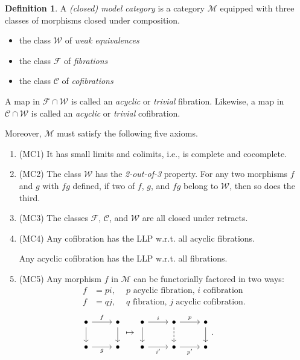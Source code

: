 \documentclass[10pt,letterpaper,cm]{nupset}
\theoremstyle{definition}
\newtheorem{defn}{Definition}[subsection]
\theoremstyle{theorem}
\theoremstyle{remark}
\newcommand{\1}{\mathbb{1}}
\newcommand{\cf}{\mathscr{C}}
\newcommand{\f}{\mathscr{F}}
\newcommand{\m}{\mathcal{M}}
\newcommand{\w}{\mathscr{W}}
\newcommand{\0}{\vec 0}
\newcommand{\bi}{\begin{itemize}}
\newcommand{\ei}{\end{itemize}}
\newcommand{\be}{\begin{enumerate}}
\newcommand{\ee}{\end{enumerate}}
\begin{document}
\begin{defn}
A \textit{(closed) model category} is a category $\m$ equipped with three classes of morphisms closed under composition.
\bi
\item the class $\w$ of \textit{weak equivalences}
\item the class $\f$ of \textit{fibrations}
\item the class $\cf$ of \textit{cofibrations}
\ei
A  map in $\f \cap \w$ is called an \textit{acyclic} or \textit{trivial} fibration. Likewise, a  map in $\cf \cap \w$ is called an \textit{acyclic} or \textit{trivial} cofibration. 

\smallskip

Moreover, $\m$ must satisfy the following five axioms.
\be
\item[(MC1)] It has small limits and colimits, i.e., is complete and cocomplete.
\item[(MC2)] The class $\w$ has the \textit{2-out-of-3} property. For any two morphisms $f$ and $g$ with $fg$ defined, if two of $f$, $g$, and $fg$ belong to $\w$, then so does the third.
\item[(MC3)] The classes $\f$, $\cf$, and $\w$ are all closed under retracts.
\item[(MC4)] Any cofibration has the LLP w.r.t. all acyclic fibrations.

Any acyclic cofibration has the LLP w.r.t. all fibrations. 
\item[(MC5)] Any morphism $f$ in $\m$ can be functorially factored in two ways:
\begin{align*}
f & = pi, \ \quad \text{$p$ acyclic fibration, $i$ cofibration} 
\\ f & = qj, \ \quad  \text{$q$ fibration, $j$  acyclic cofibration} 
.
\end{align*}
\[
 \begin{tikzcd}
	\bullet & \bullet \\
	\bullet & \bullet
	\arrow["f", from=1-1, to=1-2]
	\arrow["g"', from=2-1, to=2-2]
	\arrow[from=1-1, to=2-1]
	\arrow[from=1-2, to=2-2]
\end{tikzcd}  \mapsto 
\begin{tikzcd}
	\bullet & \bullet & \bullet \\
	\bullet & \bullet & \bullet
	\arrow["i", from=1-1, to=1-2]
	\arrow["{i'}"', from=2-1, to=2-2]
	\arrow[from=1-1, to=2-1]
	\arrow[dashed, from=1-2, to=2-2]
	\arrow["{p'}"', from=2-2, to=2-3]
	\arrow["p", from=1-2, to=1-3]
	\arrow[from=1-3, to=2-3]
\end{tikzcd}. \quad \quad \quad \quad 
\]

\ee
\end{defn}
\end{document}
